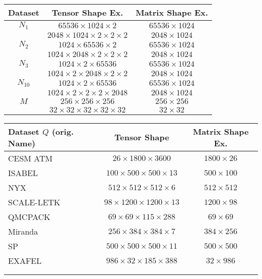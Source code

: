 \centering
\footnotesize
\begin{tabular}{ccc}
	\toprule
	Dataset    & Tensor Shape Ex.  & Matrix Shape Ex. \\ 
	\midrule
	$N_1$      & $65536\times1024\times2$               & $65536\times1024$ \\
	           & $2048\times1024\times2\times2\times2$  & $2048\times1024$ \\
	$N_2$      & $1024\times65536\times2$               & $65536\times1024$ \\
               & $1024\times2048\times2\times2\times2$  & $2048\times1024$ \\
	$N_3$      & $1024\times2\times65536$               & $65536\times1024$ \\
               & $1024\times2\times2048\times2\times2$  & $2048\times1024$ \\
	$N_{10}$   & $1024\times2\times65536$               & $65536\times1024$ \\
               & $1024\times2\times2\times2\times2048$  & $2048\times1024$ \\
    \midrule
	$M$        & $256\times256\times256$                & $256\times256$ \\
               & $32\times32\times32\times32\times32$   & $32\times32$ \\
	\bottomrule
\end{tabular}
\hfill
\begin{tabular}{lcc}
	\toprule
	Dataset $Q$ (orig. Name)   & Tensor Shape & Matrix Shape Ex. \\ 
	\midrule
	CESM ATM   & $26\times1800\times3600$               & $1800\times26$ \\
	ISABEL     & $100\times 500\times 500\times 13$     & $500\times100$ \\
	NYX        & $512\times 512\times 512\times  6$     & $512\times512$ \\
	SCALE-LETK & $98\times1200\times1200\times 13$      & $1200\times98$ \\
	QMCPACK    & $69\times  69\times 115\times288$      & $69\times69$ \\
	Miranda    & $256\times 384\times 384\times  7$     & $384\times256$ \\
	SP         & $500\times 500\times 500\times 11$     & $500\times500$ \\
	EXAFEL     &  $986\times  32\times 185\times388$    & $32\times986$ \\
	           &&\\
	           &&\\
	\midrule 
	\bottomrule
\end{tabular}